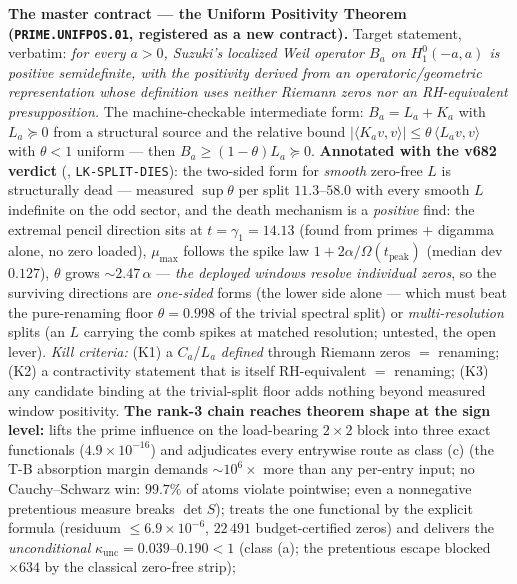 \documentclass[11pt,a4paper]{article}
\begin{document}
\textbf{The master contract --- the Uniform Positivity Theorem
(\texttt{PRIME.UNIFPOS.01}, registered as a new contract).}  Target
statement, verbatim: \emph{for every $a>0$, Suzuki's localized Weil
operator $B_a$ on $H^0_1(-a,a)$ is positive semidefinite, with the
positivity derived from an operatoric/geometric representation whose
definition uses neither Riemann zeros nor an RH-equivalent
presupposition.}  The machine-checkable intermediate form: $B_a=L_a
+K_a$ with $L_a\succeq0$ from a structural source and the relative
bound $|\langle K_av,v\rangle|\le\theta\,\langle L_av,v\rangle$ with
$\theta<1$ uniform --- then $B_a\ge(1-\theta)L_a\succeq0$.
\textbf{Annotated with the v682 verdict}
(, \texttt{LK-SPLIT-DIES}): the
two-sided form for \emph{smooth} zero-free $L$ is structurally dead
--- measured $\sup\theta$ per split $11.3$--$58.0$ with every smooth
$L$ indefinite on the odd sector, and the death mechanism is a
\emph{positive} find: the extremal pencil direction sits at
$t=\gamma_1=14.13$ (found from primes $+$ digamma alone, no zero
loaded), $\mu_{\max}$ follows the spike law $1+2\alpha/\Omega
(t_{\mathrm{peak}})$ (median dev $0.127$), $\theta$ grows
$\sim2.47\,\alpha$ --- \emph{the deployed windows resolve individual
zeros}, so the surviving directions are \emph{one-sided} forms (the
lower side alone --- which must beat the pure-renaming floor
$\theta=0.998$ of the trivial spectral split) or
\emph{multi-resolution} splits (an $L$ carrying the comb spikes at
matched resolution; untested, the open lever).  \emph{Kill criteria:}
(K1) a $C_a$/$L_a$ \emph{defined} through Riemann zeros $=$ renaming;
(K2) a contractivity statement that is itself RH-equivalent $=$
renaming; (K3) any candidate binding at the trivial-split floor adds
nothing beyond measured window positivity.  \textbf{The rank-3 chain
reaches theorem shape at the sign level:}
 lifts the prime influence on the
load-bearing $2\times2$ block into three exact functionals
($4.9\times10^{-16}$) and adjudicates every entrywise route as class
(c) (the T-B absorption margin demands $\sim10^{6}\times$ more than
any per-entry input; no Cauchy--Schwarz win: $99.7\%$ of atoms
violate pointwise; even a nonnegative pretentious measure breaks
$\det S$);  treats the one functional
by the explicit formula (residuum $\le6.9\times10^{-6}$, $22\,491$
budget-certified zeros) and delivers the \emph{unconditional}
$\kappa_{\mathrm{unc}}=0.039$--$0.190<1$ (class (a); the pretentious
escape blocked $\times634$ by the classical zero-free strip);
\end{document}
